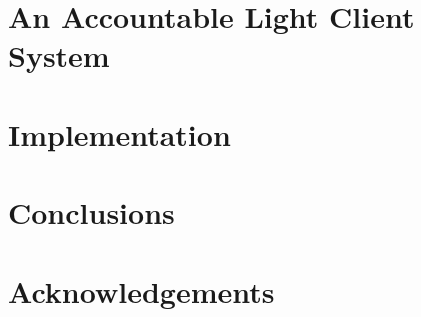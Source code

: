 \documentclass[10pt]{article}
\begin{document}
\section{An Accountable Light Client System} \label{sec_light_client_model}



\section{Implementation} \label{sec_implementation}
%


\section{Conclusions}\label{conclusions}


\section{Acknowledgements} \label{sec_ack}


 

\appendix
%



 


%


\end{document}
